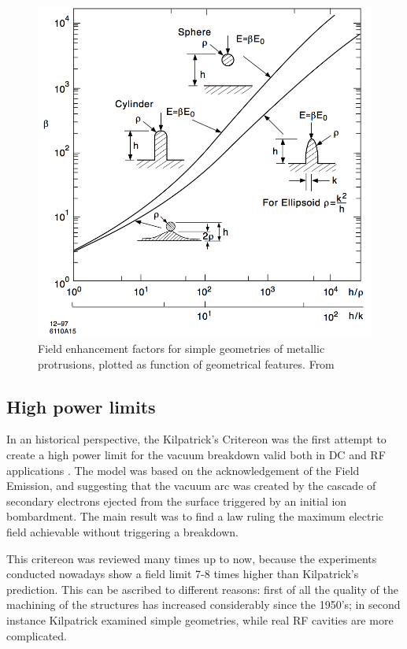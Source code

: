 \begin{figure}[h]
\centering

\includegraphics[scale=0.3]{pictures/beta_tip_val}
\caption{Field enhancement factors for simple geometries of metallic protrusions, plotted as function of geometrical features. From \cite{Rohrbach:190223}}
\label{tip_factors}

\end{figure}





\subsection[High power limits]{High power limits}

In an historical perspective, the Kilpatrick's Critereon was the first attempt to create a high power limit for the vacuum breakdown valid both in DC and RF applications \cite{KilpLimit}. The model was based on the acknowledgement of the Field Emission, and suggesting that the vacuum arc was created by the cascade of secondary electrons ejected from the surface triggered by an initial ion bombardment. The main result was to find a law ruling the maximum electric field achievable without triggering a breakdown. 

This critereon was reviewed many times up to now, because the experiments conducted nowadays show a field limit 7-8 times higher than Kilpatrick's prediction. This can be ascribed to different reasons: first of all the quality of the machining of the structures has increased considerably since the 1950's; in second instance Kilpatrick examined simple geometries, while real RF cavities are more complicated.

